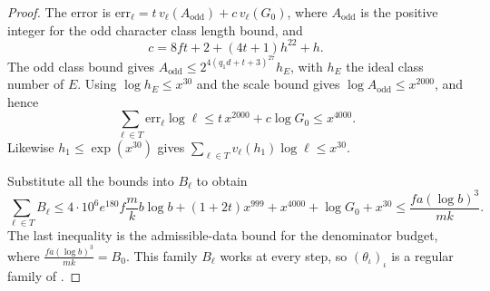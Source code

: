 \begin{proof}
The error is $\mathrm{err}_\ell=t\,v_\ell(A_{\mathrm{odd}})+c\,v_\ell(G_0)$, where $A_{\mathrm{odd}}$ is the positive integer for the odd character class length bound, and
\[
 c=8ft+2+(4t+1)h^{22}+h.
\]
The odd class bound gives $A_{\mathrm{odd}}\le 2^{4(q_1d+t+3)^{27}}h_E$, with $h_E$ the ideal class number of $E$.
Using $\log h_E\le x^{30}$ and the scale bound gives $\log A_{\mathrm{odd}}\le x^{2000}$, and hence
\[
 \sum_{\ell\in T}\mathrm{err}_\ell\log\ell
 \le t\,x^{2000}+c\log G_0\le x^{4000}.
\]
Likewise $h_1\le\exp(x^{30})$ gives $\sum_{\ell\in T}v_\ell(h_1)\log\ell\le x^{30}$.

Substitute all the bounds into $B_\ell$ to obtain
\[
 \sum_{\ell\in T} B_\ell
 \le 4\cdot10^6 e^{180} f\frac{m}{k}b\log b
 +(1+2t)x^{999}+x^{4000}+\log G_0+x^{30}
 \le \frac{fa(\log b)^3}{mk}.
\]
The last inequality is the admissible-data bound for the denominator budget, where $\frac{fa(\log b)^3}{mk}=B_0$. This family $B_\ell$ works at every step, so $(\theta_\iota)_\iota$ is a regular family of .
\end{proof}
